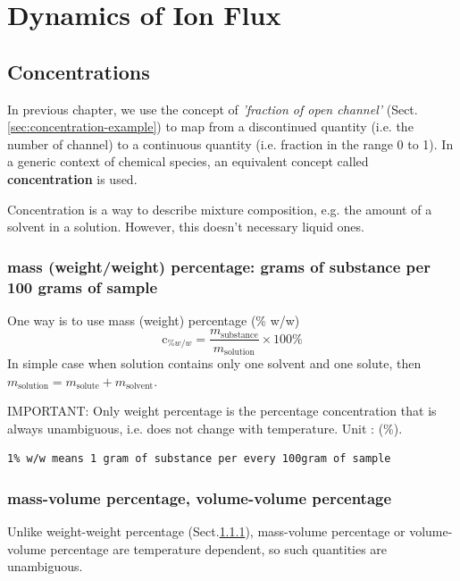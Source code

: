 \chapter{Dynamics of Ion Flux}

\section{Concentrations}
\label{sec:concentrations}

In previous chapter, we use the concept of {\it 'fraction of open channel'}
(Sect.\ref{sec:concentration-example}) to map from a discontinued quantity (i.e.
the number of channel) to a continuous quantity (i.e. fraction in the range 0 to
1). In a generic context of chemical species, an equivalent concept called {\bf
concentration} is used.

Concentration is a way to describe mixture composition, e.g. the
amount of a solvent in a solution. However, this doesn't necessary
liquid ones. 

\subsection{mass (weight/weight) percentage: grams of substance per 100 grams of
sample}
\label{sec:concentration-mass-percentage}

One way is to use mass (weight) percentage (\% w/w)
\begin{equation}
  \label{eq:999}
  \text{c}_{\% w/w} = \frac{m_\text{substance}}{m_\text{solution}} \times 100\%
\end{equation}
In simple case when solution contains only one solvent and one solute,
then $m_\text{solution} = m_\text{solute}+m_\text{solvent}$.  

IMPORTANT: Only weight percentage is the percentage concentration that is always
unambiguous, i.e. does not change with temperature. Unit : (\%). 

\begin{verbatim}
1% w/w means 1 gram of substance per every 100gram of sample
\end{verbatim}

\subsection{mass-volume percentage, volume-volume percentage}

Unlike weight-weight percentage (Sect.\ref{sec:concentration-mass-percentage}),
mass-volume percentage or volume-volume percentage are temperature dependent, so
such quantities are unambiguous.

